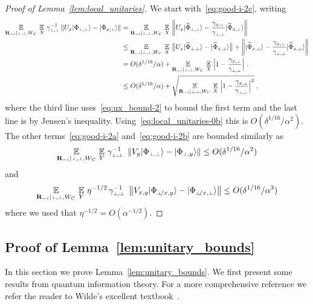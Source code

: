 \begin{proof}[Proof of Lemma~\ref{lem:local_unitaries}]
We start with~\eqref{eq:good-i-2c}, writing
\begin{align*}
	\Ex_{\bR_\mi | \dummy, \dummy, W_C} \, \Ex_X \, \gamma_\pp^{-1} \left \|  U_x \ket{{\Phi}_{\dummy,\dummy}} -  \ket{{\Phi}_{x,\dummy}} \right \| 
	&= 	\Ex_{\bR_\mi | \dummy, \dummy, W_C} \, \Ex_X \, \left \|  U_x \ket{\wt{\Phi}_{\dummy,\dummy}} -  \frac{\gamma_{\xp}}{\gamma_\pp} \ket{\wt{\Phi}_{x,\dummy}} \right \|\\
	&\leq  \Ex_{\bR_\mi | \dummy, \dummy, W_C} \, \Ex_X \, \big \|  U_x \ket{\wt{\Phi}_{\dummy,\dummy}} - \ket{\wt{\Phi}_{x,\dummy}} \big \| + \left \| \ket{\wt{\Phi}_{x,\dummy}} - \frac{\gamma_{\xp}}{\gamma_\pp} \ket{\wt{\Phi}_{x,\dummy}}\right \|\\
&= O(\delta^{1/16}/\alpha) + \Ex_{\bR_\mi | \dummy, \dummy, W_C} \, \Ex_X \, \Big | 1 - \frac{\gamma_{\xp}}{\gamma_\pp} \Big |~. \\
	&\leq O(\delta^{1/16}/\alpha) + \sqrt{\Ex_{\bR_\mi | \dummy, \dummy, W_C} \, \Ex_X \, \Big | 1 - \frac{\gamma_{\xp}}{\gamma_\pp} \Big |^2} \;,
	\end{align*}
	where the third line uses~\eqref{eq:ux_bound-2} to bound the first term and the last line is	by Jensen's inequality. Using~\eqref{eq:local_unitaries-0b} this is $O(\delta^{1/16}/\alpha^2)$.
The other terms~\eqref{eq:good-i-2a} and~\eqref{eq:good-i-2b} are bounded similarly as
\[
\Ex_{\bR_\mi | \dummy, \dummy, W_C} \, \Ex_Y \, \gamma_\pp^{-1} \,\, \left \|  V_y \ket{{\Phi}_{\dummy,\dummy}} -  \ket{{\Phi}_\py} \right \| 	\leq O(\delta^{1/16}/\alpha^2)
\]
and
\[
\Ex_{\bR_\mi | \dummy, \dummy, W_C} \, \Ex_Y \, \eta^{-1/2} \, \gamma_\pp^{-1} \,\, \left \|  V_{x,y} \ket{{\Phi}_{\pxy}} -  \ket{{\Phi}_\pxp} \right \| 	\leq O(\delta^{1/16}/\alpha^3)
\]
where we used that $\eta^{-1/2} = O(\alpha^{-1/2})$. 
\end{proof}


\subsection{Proof of Lemma~\ref{lem:unitary_bounds}}\label{sec:local-unitaries}

In this section we prove Lemma~\ref{lem:unitary_bounds}. We first present some results from quantum information theory. For a more comprehensive reference we refer the reader to Wilde's excellent textbook~\cite{wilde2013quantum}.

